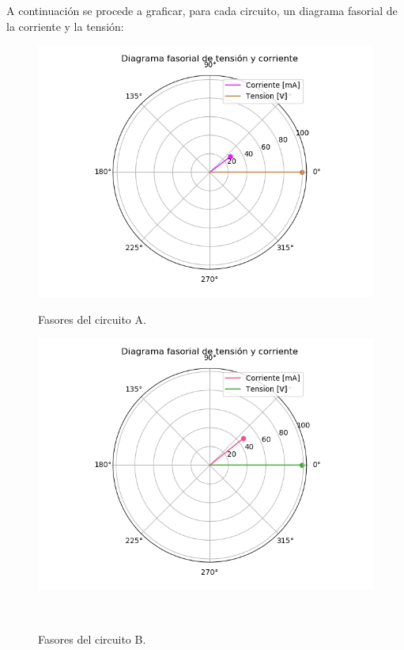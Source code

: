 \documentclass[a4paper]{article}
\begin{document}
A continuación se procede a graficar, para cada circuito, un diagrama fasorial de la corriente y la tensión:

\begin{figure}[H]
\centering
\begin{minipage}{.5\textwidth}
	\centering
	\includegraphics[width=1.2\linewidth]{Fasorial-1A.png}
	\caption{Fasores del circuito A.}
	\label{fig:faso-1a}
\end{minipage}
\begin{minipage}{.5\textwidth}
	\centering
	\includegraphics[width=1.2\linewidth]{Fasorial-1B.png}
	\caption{Fasores del circuito B.}
	\label{fig:faso-1b}
\end{minipage}\\
\end{figure}
\end{document}
